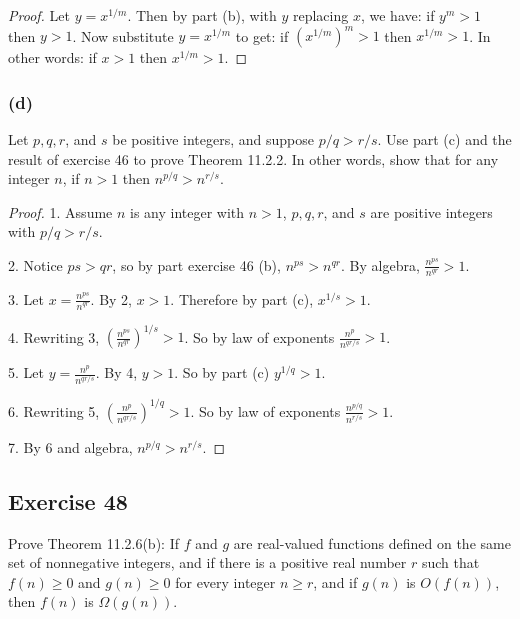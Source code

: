 \documentclass[14pt]{extarticle}
\newcommand{\dps}{\displaystyle}
\begin{document}
\begin{proof}
    Let \(y = x^{1/m}\). Then by part (b), with \(y\) replacing \(x\), we have: if \(y^m > 1\) then \(y > 1\). Now substitute
    \(y = x^{1/m}\) to get: if \((x^{1/m})^m > 1\) then
    \(x^{1/m} > 1\). In other words: if \(x > 1\) then \(x^{1/m} > 1\).
\end{proof}

\subsubsection{(d)}
Let \(p, q, r\), and \(s\) be positive integers, and suppose \(p/q > r/s\). Use part (c) and the result of exercise 46 to
prove Theorem 11.2.2. In other words, show that for any integer \(n\), if \(n > 1\) then \(n^{p/q} > n^{r/s}\).

\begin{proof}
    1. Assume \(n\) is any integer with \(n > 1\), \(p, q, r\), and \(s\) are positive integers with \(p/q > r/s\).

    2. Notice \(ps > qr\), so by part exercise 46 (b), \(n^{ps} > n^{qr}\). By algebra, \(\dps \frac{n^{ps}}{n^{qr}} > 1\).

    3. Let \(\dps x = \frac{n^{ps}}{n^{qr}}\). By 2, \(x > 1\). Therefore by part (c), \(x^{1/s} > 1\).

    4. Rewriting 3, \(\dps \left(\frac{n^{ps}}{n^{qr}}\right)^{1/s} > 1\).
    So by law of exponents \(\dps \frac{n^p}{n^{qr/s}}>1\).

    5. Let \(\dps y = \frac{n^p}{n^{qr/s}}\). By 4, \(y > 1\). So by part (c) \(y^{1/q} > 1\).

    6. Rewriting 5, \(\dps \left(\frac{n^p}{n^{qr/s}}\right)^{1/q} > 1\).
    So by law of exponents \(\dps \frac{n^{p/q}}{n^{r/s}} > 1\).

    7. By 6 and algebra, \(n^{p/q} > n^{r/s}\).
\end{proof}

\subsection{Exercise 48}
Prove Theorem 11.2.6(b): If \(f\) and \(g\) are real-valued functions defined on the same set of nonnegative integers, and
if there is a positive real number \(r\) such that \(f(n) \geq 0\) and \(g(n) \geq 0\) for every integer \(n \geq r\), and if
\(g(n)\) is \(O(f(n))\), then \(f(n)\) is \(\Omega(g(n))\).
\end{document}
